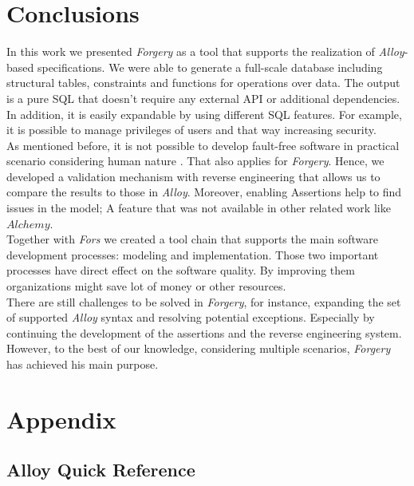\documentclass[oneside]{book}
\begin{document}
\newpage

\chapter{Conclusions}

In this work we presented \textit{Forgery} as a tool that supports the realization of \textit{Alloy}-based specifications. We were able to generate a full-scale database including structural tables, constraints and functions for operations over data. The output is a pure SQL that doesn't require any external API or additional dependencies. In addition, it is easily expandable by using different SQL features. For example, it is possible to manage privileges of users and that way increasing security.\\ 

As mentioned before, it is not possible to develop fault-free software in practical scenario considering human nature \cite{reliability}. That also applies for \textit{Forgery}. Hence, we developed a validation mechanism with reverse engineering that allows us to compare the results to those in \textit{Alloy}. Moreover, enabling Assertions help to find issues in the model; A feature that was not available in other related work like $Alchemy$.\\

Together with \textit{Fors} we created a tool chain that supports the main software development processes: modeling and implementation. Those two important processes have direct effect on the software quality. By improving them organizations might save lot of money or other resources.\\

There are still challenges to be solved in \textit{Forgery}, for instance, expanding the set of supported \textit{Alloy} syntax and resolving potential exceptions. Especially by continuing the development of the assertions and the reverse engineering system. However, to the best of our knowledge, considering multiple scenarios, \textit{Forgery} has achieved his main purpose. 

\nocite{*}



\chapter{Appendix}
\section{Alloy Quick Reference}
\end{document}
